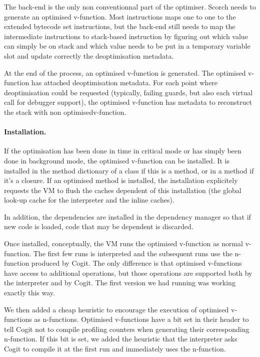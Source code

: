 \documentclass[a4paper,12pt,twoside]{../includes/ThesisStyle}
\begin{document}
The back-end is the only non conventionnal part of the optimiser. Scorch needs to generate an optimised v-function. Most instructions maps one to one to the extended bytecode set instructions, but the back-end still needs to map the intermediate instructions to stack-based instruction by figuring out which value can simply be on stack and which value needs to be put in a temporary variable slot and update correctly the deoptimisation metadata.

At the end of the process, an optimised v-function is generated. The optimised v-function has attached deoptimisation metadata. For each point where deoptimisation could be requested (typically, failing guards, but also each virtual call for debugger support), the optimised v-function has metadata to reconstruct the stack with non optimisedv-function.

\paragraph{Installation.}
If the optimisation has been done in time in critical mode or has simply been done in background mode, the optimised v-function can be installed. It is installed in the method dictionary of a class if this is a method, or in a method if it's a closure. If an optimised method is installed, the installation explicitely requests the VM to flush the caches dependent of this installation (the global look-up cache for the interpreter and the inline caches).

In addition, the dependencies are installed in the dependency manager so that if new code is loaded, code that may be dependent is discarded.

Once installed, conceptually, the VM runs the optimised v-function as normal v-function. The first few runs is interpreted and the subsequent runs use the n-function produced by Cogit. The only difference is that optimised v-functions have access to additional operations, but those operations are supported both by the interpreter and by Cogit. The first version we had running was working exactly this way.

We then added a cheap heuristic to encourage the execution of optimised v-functions as n-functions. Optimised v-functions have a bit set in their header to tell Cogit not to compile profiling counters when generating their corresponding n-function. If this bit is set, we added the heuristic that the interpreter asks Cogit to compile it at the first run and immediately uses the n-function. 
\end{document}
